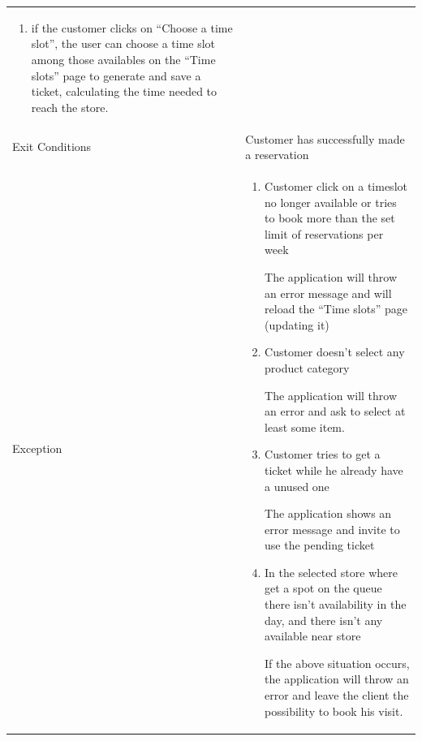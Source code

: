 \documentclass{article}
\newcommand\xrowht[2][0]
{\addstackgap[.5\dimexpr#2\relax]{\vphantom{#1}}}
\begin{document}
\begin{center}
\begin{adjustwidth}{-2.8cm}{}
\begin{tabular}[h!]{|m{7.5em}|m{36em}|}
\begin{enumerate}
\begin{enumerate}
								
								\item if the customer clicks on “Choose a time slot”, the user can choose a time slot among those availables on the “Time slots” page to generate and save a ticket, calculating the time needed to reach the store.
								
							\end{enumerate}
							
						\end{enumerate}\\
						\xrowht{5pt}
						Exit Conditions & Customer has successfully made a reservation\\
						\xrowht{5pt}
						Exception & \begin{enumerate}
							
							\itemsep-0.25em
							\item Customer click on a timeslot no longer available or tries to book more than the set limit of reservations per week
							
							The application will throw an error message and will reload the “Time slots” page (updating it)
							
							\item Customer doesn’t select any product category
							
							The application will throw an error and ask to select at least some item.
							
							\item Customer tries to get a ticket while he already have a unused one

							The application shows an error message and invite to use the pending ticket
							\item In the selected store where get a spot on the queue there isn't availability in the day, and there isn't any available near store 

							If the above situation occurs, the application will throw an error and leave the client the possibility to book his visit.
							
							
						\end{enumerate}
							\\
							\hline
						
						
					\end{tabular}
					\end{adjustwidth}
					

\end{center}
\end{document}
